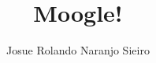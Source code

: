 \documentclass{beamer}
\title{Moogle!}
\author{Josue Rolando Naranjo Sieiro}
\institute{Facultad de Matemática y Computación}
\date{}
\begin{document}
\begin{frame}
	\titlepage
\end{frame}




\end{document}
